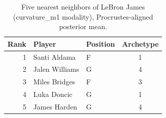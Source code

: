 \begin{table}[htbp]
  \centering\small
  \begin{tabular}{rllc}
    \toprule
    Rank & Player & Position & Archetype \\
    \midrule
    1 & Santi Aldama & F & 1 \\
    2 & Jalen Williams & G & 4 \\
    3 & Miles Bridges & F & 3 \\
    4 & Luka Doncic & G & 1 \\
    5 & James Harden & G & 4 \\
    \bottomrule
  \end{tabular}
  \caption{Five nearest neighbors of LeBron James (curvature_m1 modality), Procrustes-aligned posterior mean.}
  \label{tab:LeBron_James_neighbors_curvature_m1}
\end{table}

